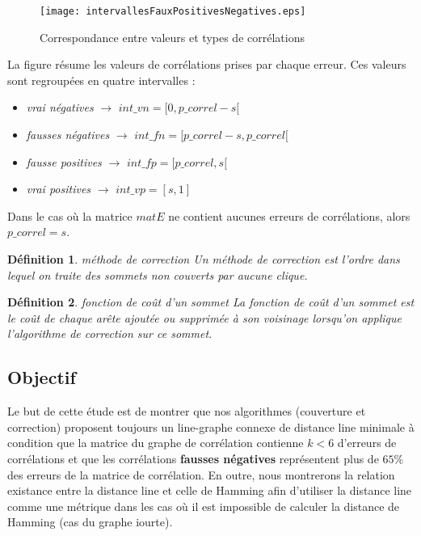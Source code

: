 \documentclass[onecolumn, 12pt]{book}
\newtheorem{definition}{D\'efinition}
\begin{document}
\begin{figure}[htb!] 
\centering
\texttt{[image: intervallesFauxPositivesNegatives.eps]}
\caption{ Correspondance entre valeurs et types de corr\'elations }
\label{intervallesFauxPositivesNegatives} 
\end{figure}

La figure r\'esume les valeurs de corr\'elations prises par chaque erreur. Ces valeurs sont regroup\'ees en quatre intervalles :
\begin{itemize}
\item {\em vrai n\'egatives} $\rightarrow$ $int\_vn = [0, p\_correl - s[$
\item {\em fausses n\'egatives} $\rightarrow$ $int\_fn = [p\_correl - s, p\_correl[$
\item {\em fausse positives} $\rightarrow$ $int\_fp = [p\_correl, s[$
\item {\em vrai positives} $\rightarrow$ $int\_vp = [s, 1]$
\end{itemize}
Dans le cas o\`u la matrice $matE$ ne contient aucunes erreurs de corr\'elations, alors $p\_correl = s$.

\begin{definition}{ m\'ethode de correction } \newline
Un m\'ethode de correction est l'ordre dans lequel on traite des sommets non couverts par aucune clique.
\end{definition}

\begin{definition}{ fonction de co\^ut d'un sommet} \newline
La fonction de co\^ut d'un sommet est le co\^ut de chaque ar\^ete ajout\'ee ou supprim\'ee \`a son voisinage lorsqu'on applique l'algorithme de correction sur ce sommet.
\end{definition}

\subsection{Objectif}
Le but de cette \'etude est de montrer que nos algorithmes (couverture et correction) proposent
toujours un line-graphe connexe de distance line minimale
\`a condition que la matrice du graphe de corr\'elation contienne $k<6$ d'erreurs de corr\'elations
et que les corr\'elations {\bf fausses n\'egatives} repr\'esentent plus de $65\%$ des erreurs de la matrice de corr\'elation.
En outre, nous montrerons la relation existance entre la distance line et celle de Hamming afin d'utiliser la distance line comme une m\'etrique dans les cas o\`u il est impossible de calculer la distance de Hamming (cas du graphe iourte).
\end{document}
